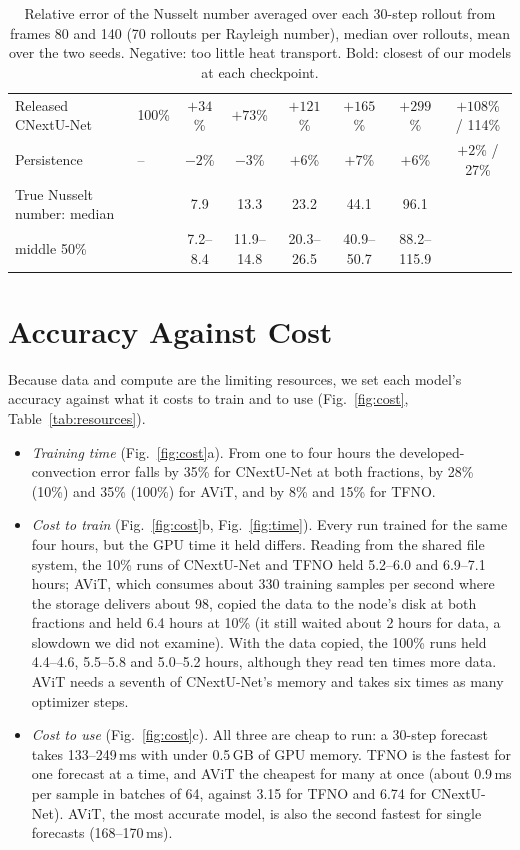 \documentclass[11pt]{article}
\begin{document}
\begin{table}[tp]
\begin{tabular}{@{}llcccccc@{}}
\midrule
Released CNextU-Net & 100\% & $+34$\% & $+73$\% & $+121$\% & $+165$\% & $+299$\% & $+108$\% / 114\% \\
Persistence & -- & $-2$\% & $-3$\% & $+6$\% & $+7$\% & $+6$\% & $+2$\% / 27\% \\
\midrule
True Nusselt number: median & & 7.9 & 13.3 & 23.2 & 44.1 & 96.1 & \\
\quad middle 50\% & & 7.2--8.4 & 11.9--14.8 & 20.3--26.5 & 40.9--50.7 & 88.2--115.9 & \\
\bottomrule
\end{tabular}
\caption{Relative error of the Nusselt number averaged over each 30-step rollout from frames 80 and 140 (70 rollouts
per Rayleigh number), median over rollouts, mean over the two seeds. Negative: too little heat transport. Bold: closest
of our models at each checkpoint.}
\label{tab:nusselt}
\end{table}

\section{Accuracy Against Cost}
\label{sec:cost}

Because data and compute are the limiting resources, we set each model's accuracy against what it costs to train and
to use (Fig.~\ref{fig:cost}, Table~\ref{tab:resources}).
\begin{itemize}
    \item \emph{Training time} (Fig.~\ref{fig:cost}a). From one to four hours the developed-convection error falls
    by 35\% for CNextU-Net at both fractions, by 28\% (10\%) and 35\% (100\%) for AViT, and by 8\% and 15\% for TFNO.
    \item \emph{Cost to train} (Fig.~\ref{fig:cost}b, Fig.~\ref{fig:time}). Every run trained for the same four
    hours, but the GPU time it held differs. Reading from the shared file system, the 10\% runs of CNextU-Net and TFNO
    held 5.2--6.0 and 6.9--7.1 hours; AViT, which consumes about 330 training samples per second where the storage
    delivers about 98, copied the data to the node's disk at both fractions and held 6.4 hours at 10\% (it still waited
    about 2 hours for data, a slowdown we did not examine). With the data copied, the 100\% runs held 4.4--4.6, 5.5--5.8
    and 5.0--5.2 hours, although they read ten times more data. AViT needs a seventh of CNextU-Net's memory and takes
    six times as many optimizer steps.
    \item \emph{Cost to use} (Fig.~\ref{fig:cost}c). All three are cheap to run: a 30-step forecast takes
    133--249\,ms with under 0.5\,GB of GPU memory. TFNO is the fastest for one forecast at a time, and AViT the
    cheapest for many at once (about 0.9\,ms per sample in batches of 64, against 3.15 for TFNO and 6.74 for
    CNextU-Net). AViT, the most accurate model, is also the second fastest for single forecasts (168--170\,ms).
\end{itemize}
\end{document}
